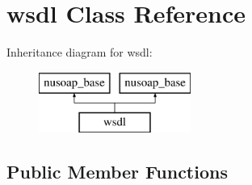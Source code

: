 \hypertarget{classwsdl}{}\section{wsdl Class Reference}
\label{classwsdl}
Inheritance diagram for wsdl\+:\begin{figure}[H]
\begin{center}
\leavevmode
\includegraphics[height=2.000000cm]{classwsdl}
\end{center}
\end{figure}
\subsection*{Public Member Functions}
